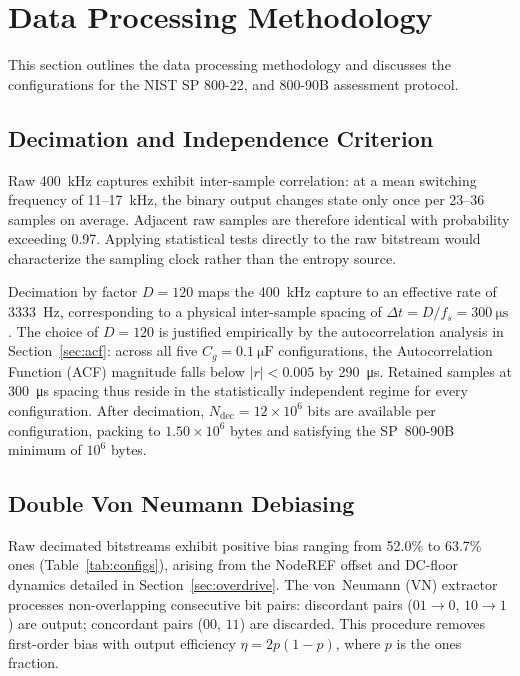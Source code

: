\documentclass[conference]{IEEEtran}
\newcommand{\Cg}{\ensuremath{C_g}}
\begin{document}
\section{Data Processing Methodology}\label{sec:method}
This section outlines the data processing methodology and discusses the configurations for the NIST SP 800-22, and 800-90B assessment protocol.

\subsection{Decimation and Independence Criterion}

Raw \SI{400}{\kilo\hertz} captures exhibit inter-sample
correlation: at a mean switching frequency of 11--17~kHz, the binary
output changes state only once per 23--36 samples on average. Adjacent
raw samples are therefore identical with probability exceeding 0.97.
Applying statistical tests directly to the raw bitstream would
characterize the sampling clock rather than the entropy source.

Decimation by factor $D=120$ maps the \SI{400}{\kilo\hertz} capture to
an effective rate of \SI{3333}{\hertz}, corresponding to a physical
inter-sample spacing of $\Delta t = D/f_s = \SI{300}{\micro\second}$.
The choice of $D=120$ is justified empirically by the autocorrelation
analysis in Section~\ref{sec:acf}: across all five
$\Cg=\SI{0.1}{\micro\farad}$ configurations, the Autocorrelation Function (ACF) magnitude falls
below $|r|<0.005$ by \SI{290}{\micro\second}. Retained samples at
\SI{300}{\micro\second} spacing thus reside in the statistically
independent regime for every configuration. After decimation,
$N_{\text{dec}} = 12\!\times\!10^{6}$ bits are available per
configuration, packing to $1.50\!\times\!10^{6}$ bytes and satisfying
the SP~800-90B minimum of $10^{6}$ bytes.

\subsection{Double Von Neumann Debiasing}

Raw decimated bitstreams exhibit positive bias ranging from 52.0\% to
63.7\% ones (Table~\ref{tab:configs}), arising from the NodeREF offset
and DC-floor dynamics detailed in Section~\ref{sec:overdrive}. The
von~Neumann (VN) extractor~\cite{vonneumann1951} processes
non-overlapping consecutive bit pairs: discordant pairs
($01\!\to\!0$, $10\!\to\!1$) are output; concordant pairs ($00$, $11$)
are discarded. This procedure removes first-order bias with output
efficiency $\eta = 2p(1-p)$, where $p$ is the ones fraction.
\end{document}
